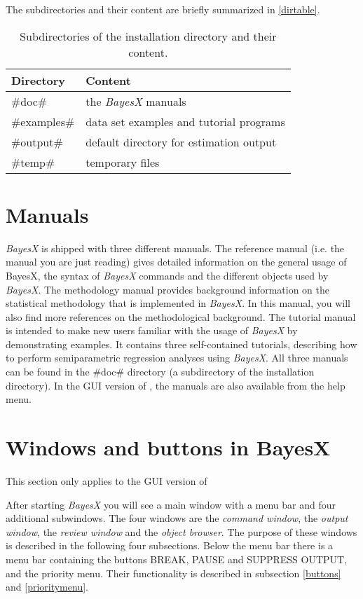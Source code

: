 The subdirectories and their content are briefly summarized in \autoref{dirtable}.

\begin{table}[ht]
\begin{center}
\begin{tabular}{|l|l|}
\hline
Directory & Content \\
\hline
#doc# & the {\em BayesX} manuals \\
#examples# & data set examples and tutorial programs \\
#output# & default directory for estimation output \\
#temp# & temporary files \\
\hline
\end{tabular}
{\em\caption{ \label{dirtable} Subdirectories of the installation directory and their content.}}
\end{center}
\end{table}

\section{Manuals}\label{bayesxmanuals}

{\em BayesX} is shipped with three different manuals. The reference manual (i.e. the manual you are just reading) gives
detailed information on the general usage of BayesX, the syntax of {\em BayesX} commands and the different objects used by {\em
BayesX}. The methodology manual provides background information on the statistical methodology that is implemented in {\em
BayesX}. In this manual, you will also find more references on the methodological background. The tutorial manual is intended
to make new users familiar with the usage of {\em BayesX} by demonstrating examples. It contains three self-contained
tutorials, describing how to perform semiparametric regression analyses using {\em BayesX}. All three manuals can be found in
the #doc# directory (a subdirectory of the installation directory). In the GUI version of \BayesX, the manuals are
also available from the help menu.

\section{Windows and buttons in BayesX}\label{bayesxwindows}

This section only applies to the GUI version of \BayesX

After starting {\em BayesX} you will see a main window with a menu bar and four additional subwindows. The four windows are the
{\em command window}, the {\em output window}, the {\em review window} and the {\em object browser}. The purpose of these
windows is described in the following four subsections. Below the menu bar there is a menu bar containing the buttons BREAK,
PAUSE and SUPPRESS OUTPUT, and the priority menu. Their functionality is described in subsection \ref{buttons} and
\ref{prioritymenu}.

